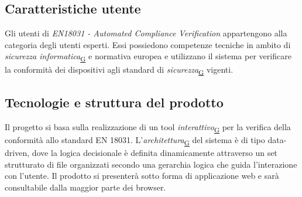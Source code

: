 ﻿\documentclass[a4paper,12pt]{article}
\begin{document}
{  \subsection{Caratteristiche utente}{
      Gli utenti di \textit{EN18031 - Automated Compliance Verification} appartengono alla categoria degli utenti esperti. Essi possiedono competenze tecniche in ambito di \textit{sicurezza informatica}\textsubscript{\href{https://atlasteam9.github.io/Atlas/glossario.html\#Sicurezzainformatica}{G}} e normativa europea e utilizzano il sistema per verificare la conformità dei dispositivi agli standard di \textit{sicurezza}\textsubscript{\href{https://atlasteam9.github.io/Atlas/glossario.html\#Sicurezza}{G}} vigenti.
  }

  \subsection{Tecnologie e struttura del prodotto}{
      Il progetto si basa sulla realizzazione di un tool \textit{interattivo}\textsubscript{\href{https://atlasteam9.github.io/Atlas/glossario.html\#Interattivo}{G}} per la verifica della conformità allo standard EN 18031. L'\textit{architettura}\textsubscript{\href{https://atlasteam9.github.io/Atlas/glossario.html\#Architettura}{G}} del sistema è di tipo data-driven, dove la logica decisionale è definita dinamicamente attraverso un set strutturato di file organizzati secondo una gerarchia logica che guida l'interazione con l'utente.
      Il prodotto si presenterà sotto forma di applicazione web e sarà consultabile dalla maggior parte dei browser.
  }
 }

\newpage
\end{document}
